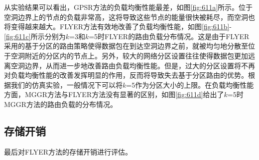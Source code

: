 从实验结果可以看出，GPSR方法的负载均衡性能最差，如图\ref{fig:611a}所示。位于空洞边界上的节点的负载非常高，这将导致这些节点的能量很快被耗尽，而空洞也将变得越来越大。FLYER方法有效地改善了负载均衡性能，如图\ref{fig:611b}-\ref{fig:611c}所示分别为$k$=3和$k$=5时FLYER的路由负载分布情况。这是由于FLYER采用的基于分区的路由策略使得数据包在到达空洞边界之前，就被均匀地分散至位于空洞附近的分区内的节点上。另外，较大的网络分区设置往往使得数据包更加远离空洞边界，从而进一步地改善路由负载均衡性能。但是，过大的分区设置将不再对负载均衡性能的改善发挥明显的作用，反而将导致失去基于分区路由的优势。根据我们的仿真实验，一般情况下可以将$k$=5作为分区大小的上限。在负载均衡性能方面，MGGR方法与FLYER方法没有显著的区别，如图\ref{fig:611d}给出了$k$=5时MGGR方法的路由负载的分布情况。
\subsection{存储开销}
最后对FLYER方法的存储开销进行评估。
